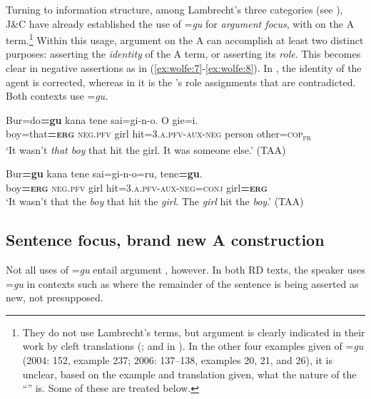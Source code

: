 \documentclass[output=paper,modfonts]{langscibook}
\begin{document}
Turning to information structure, among Lambrecht’s three  categories (see ), J\&C have already established the use of =\textit{gu} for \textit{argument focus}, with  on the A term.\footnote{They do not use Lambrecht’s terms, but argument  is clearly indicated in their work by cleft translations (\citealt[151--153, examples 232--236 and 248]{JakobiCrass2004}; and in \citealt[136, example 19]{Jakobi2006}). In the other four examples given of =\textit{gu} (2004: 152, example 237; 2006: 137--138, examples 20, 21, and 26), it is unclear, based on the example and translation given, what the nature of the “” is. Some of these are treated below.} Within this usage, argument  on the A can accomplish at least two distinct purposes: asserting the \textit{identity} of the A term, or asserting its \textit{role}. This becomes clear in negative assertions as in (\ref{ex:wolfe:7}-\ref{ex:wolfe:8}). In , the identity of the agent is corrected, whereas in  it is the ’s role assignments that are contradicted. Both contexts use =\textit{gu.}

\ea\label{ex:wolfe:7}
\gll Bur=do\textbf{=gu} kana tene sai=gi-n-o. O gie=i.\\
     boy=that\textbf{=}\textsc{\textbf{erg}}\textbf{} \textsc{neg}.\textsc{pfv} girl hit=3.\textsc{a}.\textsc{pfv}-\textsc{aux}-\textsc{neg} person other=\textsc{cop}\textsc{\textsubscript{pr}}\\
\glt ‘It wasn’t \textit{that boy} that hit the girl. It was someone else.’ (TAA)
\z

\ea\label{ex:wolfe:8}
\gll Bur\textbf{=gu} kana tene sai=gi-n-o=ru, tene\textbf{=gu}.\\
     boy\textbf{=}\textsc{\textbf{erg}}\textbf{} \textsc{neg}.\textsc{pfv} girl hit=3.\textsc{a}.\textsc{pfv}-\textsc{aux}-\textsc{neg}=\textsc{conj} girl\textbf{=}\textsc{\textbf{erg}}\\
\glt ‘It wasn’t that the \textit{boy} that hit the \textit{girl}. The \textit{girl} hit the \textit{boy}.’ (TAA)
\z

\subsection{Sentence focus, brand new A construction}\label{sec:wolfe:3.2}
Not all uses of =\textit{gu} entail argument , however. In both RD texts, the speaker uses =\textit{gu} in contexts such as  where the remainder of the sentence is being asserted as new, not presupposed. 
\end{document}
